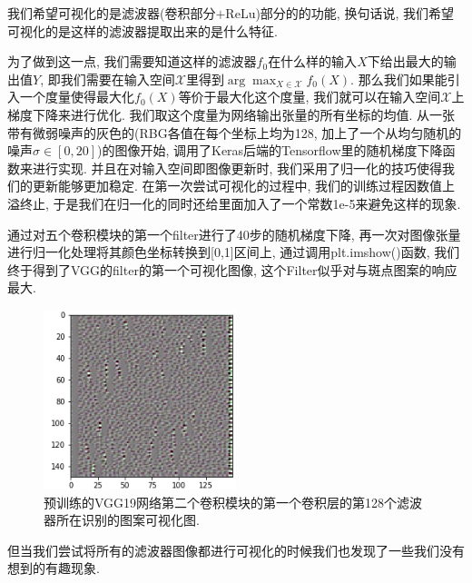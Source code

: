 \documentclass[lang=cn,11pt]{elegantpaper}
\begin{document}
我们希望可视化的是滤波器(卷积部分$+$ReLu)部分的的功能, 换句话说, 我们希望可视化的是这样的滤波器提取出来的是什么特征. 

为了做到这一点, 我们需要知道这样的滤波器$f_0$在什么样的输入$X$下给出最大的输出值$Y$, 即我们需要在输入空间$\mathcal X$里得到$\arg \max_{X\in \mathcal X} f_0(X)$. 那么我们如果能引入一个度量使得最大化$f_0(X)$等价于最大化这个度量, 我们就可以在输入空间$\mathcal X$上梯度下降来进行优化. 我们取这个度量为网络输出张量的所有坐标的均值. 从一张带有微弱噪声的灰色的(RBG各值在每个坐标上均为128, 加上了一个从均匀随机的噪声$\sigma\in[0,20]$)的图像开始, 调用了Keras后端的Tensorflow里的随机梯度下降函数来进行实现. 并且在对输入空间即图像更新时, 我们采用了归一化的技巧使得我们的更新能够更加稳定. 在第一次尝试可视化的过程中, 我们的训练过程因数值上溢终止, 于是我们在归一化的同时还给里面加入了一个常数1e-5来避免这样的现象. 

通过对五个卷积模块的第一个filter进行了40步的随机梯度下降, 再一次对图像张量进行归一化处理将其颜色坐标转换到[0,1]区间上, 通过调用plt.imshow()函数, 我们终于得到了VGG的filter的第一个可视化图像, 这个Filter似乎对与斑点图案的响应最大. 
\begin{figure}[htbp]
	\centering
  \hspace{-30pt}\includegraphics[width=0.5\textwidth]{block2_conv1_127.png}
  \tiny
  \caption{预训练的VGG19网络第二个卷积模块的第一个卷积层的第128个滤波器所在识别的图案可视化图.\label{fig:pretrain-singal}}
\end{figure}

\normalsize
但当我们尝试将所有的滤波器图像都进行可视化的时候我们也发现了一些我们没有想到的有趣现象.
\end{document}
